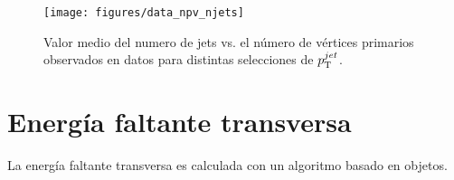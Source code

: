 \begin{figure}[ht!]
  \centering
  \texttt{[image: figures/data\_npv\_njets]}
  \caption{Valor medio del numero de jets vs. el número de vértices primarios
    observados en datos para distintas selecciones de $p_{\mathrm{T}}^{jet}$.}
    \label{fig:NjetvsPV}
\end{figure}




\section{Energía faltante transversa}
\label{sec:met_obj}

La energía faltante transversa es calculada con un algoritmo basado en objetos.

